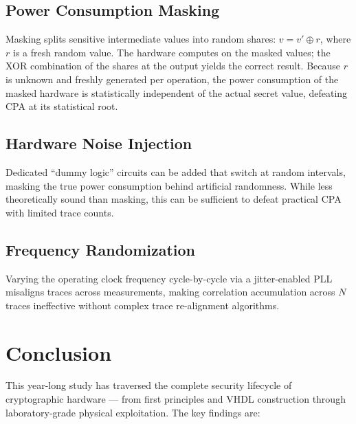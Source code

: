 \documentclass[conference, a4paper]{IEEEtran}
\begin{document}
\subsection{Power Consumption Masking}
Masking \cite{b9} splits sensitive intermediate values into random shares: $v = v' \oplus r$, where $r$ is a fresh random value. The hardware computes on the masked values; the XOR combination of the shares at the output yields the correct result. Because $r$ is unknown and freshly generated per operation, the power consumption of the masked hardware is statistically independent of the actual secret value, defeating CPA at its statistical root.

\subsection{Hardware Noise Injection}
Dedicated ``dummy logic'' circuits can be added that switch at random intervals, masking the true power consumption behind artificial randomness. While less theoretically sound than masking, this can be sufficient to defeat practical CPA with limited trace counts.

\subsection{Frequency Randomization}
Varying the operating clock frequency cycle-by-cycle via a jitter-enabled PLL misaligns traces across measurements, making correlation accumulation across $N$ traces ineffective without complex trace re-alignment algorithms.

\section{Conclusion}
\label{sec:conclusion}

This year-long study has traversed the complete security lifecycle of cryptographic hardware — from first principles and VHDL construction through laboratory-grade physical exploitation. The key findings are:
\end{document}
